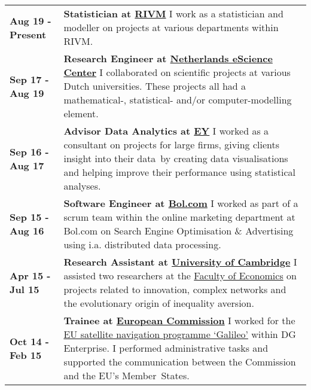\documentclass[a4paper,8pt]{extarticle}
\begin{document}
\begin{center}
\setlength{\tabcolsep}{0mm}
\begin{tabular}{p{}p{}}
\textbf{Aug 19 - Present}&\textbf{Statistician at \href{https://www.rivm.nl/}{RIVM}}\newline
I work as a statistician and modeller on projects at various departments within RIVM.
\vspace{2mm}\\
\textbf{Sep 17 - Aug 19}&\textbf{Research Engineer at \href{https://www.esciencecenter.nl}{Netherlands eScience Center}}\newline
I collaborated on scientific projects at various Dutch universities. These projects all had a mathematical-, statistical- and/or computer-modelling element.
\vspace{2mm}\\
\textbf{Sep 16 - Aug 17}&\textbf{Advisor Data Analytics at \href{http://www.ey.com/nl/nl}{ EY}}\newline
I worked as a consultant on projects for large firms, giving clients insight into their data~by creating data visualisations and helping improve their performance using statistical analyses.\vspace{2mm}\\
\textbf{Sep 15 - Aug 16}&\textbf{Software Engineer at \href{https://www.bol.com}{Bol.com}}\newline
I worked as part of a scrum team within the online marketing department at Bol.com on Search Engine Optimisation \& Advertising using i.a. distributed data processing.\vspace{2mm}\\
\textbf{Apr 15 - Jul 15}&\textbf{Research Assistant at \href{https://www.cam.ac.uk}{University of Cambridge}}\newline
I assisted two researchers at the \href{http://www.econ.cam.ac.uk}{Faculty of Economics} on projects related to innovation, complex networks and the evolutionary origin of inequality aversion.
\vspace{2mm}\\
\textbf{Oct 14 - Feb 15}&\textbf{Trainee at \href{https://ec.europa.eu/stages/}{European Commission}}\newline
I worked for the \href{https://www.gsa.europa.eu}{EU satellite navigation programme `Galileo'} within DG Enterprise. I performed administrative tasks and supported the communication between the Commission and the EU's Member~States.
\end{tabular}
\end{center}
\end{document}
